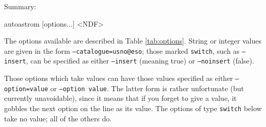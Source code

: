 \documentclass[twoside,11pt,nolof]{starlink}
\begin{document}
Summary:
\begin{terminalv}
autoastrom [options...] <NDF>
\end{terminalv}

The options available are described in Table \ref{tab:options}. String or
integer values are given in the form \texttt{--catalogue=usno@eso}; those
marked \texttt{switch}, such as \texttt{--insert}, can be specified as either
\texttt{--insert} (meaning true) or \texttt{--noinsert} (false).

Those options which take values can have those values specified as either
\texttt{--option=value} or \texttt{--option value}. The latter form is rather
unfortunate (but currently unavoidable), since it means that if you forget to
give a value, it gobbles the next option on the line as its value. The options
of type \texttt{switch} below take no value; all of the others do.
\end{document}
